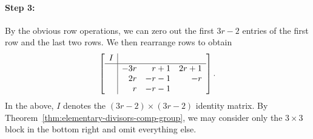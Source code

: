 \documentclass{article}
\theoremstyle{plain}
\theoremstyle{definition}
\theoremstyle{remark}
\begin{document}
\paragraph{Step 3:}
\label{sec:step-3}

By the obvious row operations, we can zero out the first $3r-2$ entries of the first row and the last two rows. We then rearrange rows to obtain
\[
\left[\begin{array}{c|rrr}
  I & & & \\ \hline
  & -3r & r+1 & 2r+1 \\
  & 2r & -r-1 & -r \\
  & r & -r-1 &
\end{array}\right].
\]
In the above, $I$ denotes the $(3r-2) \times (3r-2)$ identity matrix. By Theorem~\ref{thm:elementary-divisors-comp-group}, we may consider only the $3\times 3$ block in the bottom right and omit everything else.



\end{document}
